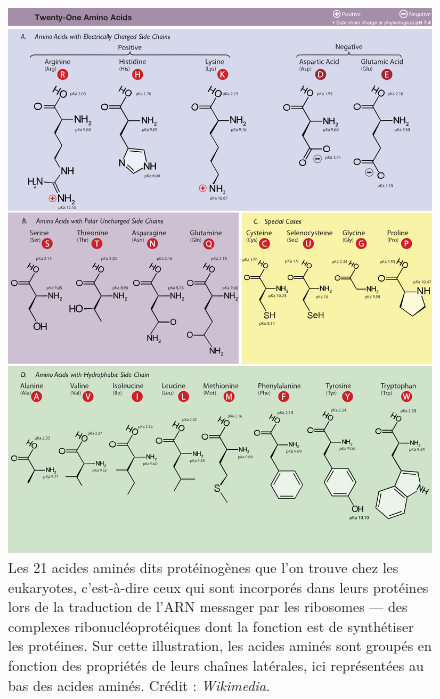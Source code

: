 	\begin{figure}[H]
		\centering
		\includegraphics[width=\textwidth]{figures/ch1/aminoAcids}
		\caption[Ensemble des acides aminés.]{Les 21 acides aminés dits protéinogènes que l'on trouve chez les eukaryotes, c'est-à-dire ceux qui sont incorporés dans leurs protéines lors de la traduction de l'ARN messager par les ribosomes --- des complexes ribonucléoprotéiques dont la fonction est de synthétiser les protéines. Sur cette illustration, les acides aminés sont groupés en fonction des propriétés de leurs chaînes latérales, ici représentées \og au bas \fg{} des acides aminés. Crédit : \emph{Wikimedia}.}
		\label{fig:aminoAcids}
	\end{figure}
    
